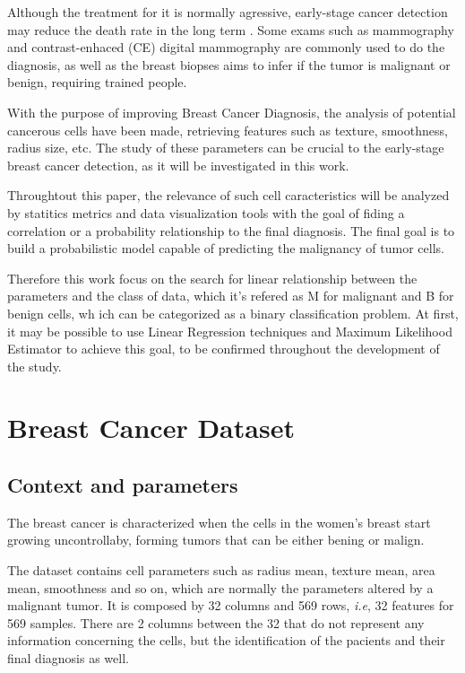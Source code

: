 \documentclass[conference]{IEEEtran}
\begin{document}
Although the treatment for it is normally agressive, early-stage cancer detection may reduce the death rate in the long term \cite{b1}. 
Some exams such as mammography and contrast-enhaced (CE) digital mammography are commonly used to do the diagnosis, 
as well as the breast biopses aims to infer if the tumor is malignant or benign, requiring trained people. 

With the purpose of improving Breast Cancer Diagnosis, the analysis of potential cancerous cells have been made,
retrieving features such as texture, smoothness, radius size, etc. The study of these parameters can be crucial 
to the early-stage breast cancer detection, as it will be investigated in this work. 

Throughtout this paper, the relevance of such cell caracteristics will be analyzed by statitics metrics and data visualization tools 
with the goal of fiding a correlation or a probability relationship to the final diagnosis. The final goal is to 
build a probabilistic model capable of predicting the malignancy of tumor cells.

Therefore this work focus on the search for linear relationship between the parameters 
and the class of data, which it's refered as M for malignant and B for benign cells, wh ich can be 
categorized as a binary classification problem. At first, it may be possible to use 
Linear Regression techniques and Maximum Likelihood Estimator to achieve this goal, to be 
confirmed throughout the development of the study. 

\section{Breast Cancer Dataset}

\subsection{Context and parameters}

The breast cancer is characterized when the cells in the women's breast start
growing uncontrollaby, forming tumors that can be either bening or malign. 

The dataset contains cell parameters such as radius mean, texture mean, area mean, 
smoothness and so on, which are normally the parameters altered by a malignant
tumor. 
It is composed by 32 columns and 569 rows, \textit{i.e}, 32 features 
for 569 samples. There are 2 columns between the 32 that do not represent any information 
concerning the cells, but the identification of the pacients and their final
diagnosis as well. 
\end{document}
